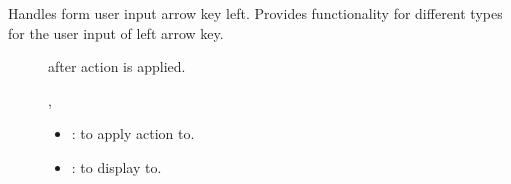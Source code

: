 \documentclass[letterpaper,10pt,english]{sphinxmanual}
\begin{document}
\begin{fulllineitems}
\begin{fulllineitems}
\end{fulllineitems}


\begin{fulllineitems}
\label{\detokenize{index:_CPPv2N7ostendo9LeftArrowE3Var6Window}}%
\pysigstartmultiline
{}\label{\detokenize{index:Pessumnamespaceostendo_1ab912de20925f952a5056414bfbdaeeda}}%
\pysigstopmultiline
Handles form user input arrow key left. Provides functionality for different {\hyperref[\detokenize{index:Pessumstructostendo_1_1Var}]{}} types for the user input of left arrow key. \begin{description}
\item[{}] \leavevmode
{\hyperref[\detokenize{index:Pessumstructostendo_1_1Var}]{}} after action is applied. 

\item[{}] \leavevmode
{\hyperref[\detokenize{index:Pessumstructostendo_1_1Var}]{}}, {\hyperref[\detokenize{index:Pessumclassostendo_1_1Window}]{}} 

\item[{}] \leavevmode\begin{itemize}
\item {} 
: {\hyperref[\detokenize{index:Pessumstructostendo_1_1Var}]{}} to apply action to. 

\item {} 
: {\hyperref[\detokenize{index:Pessumclassostendo_1_1Window}]{}} to display to. 

\end{itemize}

\end{description}


\end{fulllineitems}


\end{fulllineitems}
\end{document}
